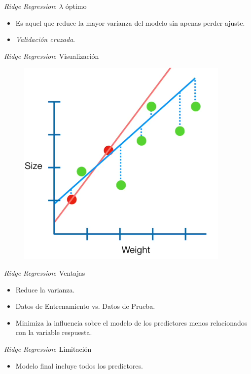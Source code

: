 \documentclass[11pt]{beamer}
\begin{document}
\begin{frame}{\textit{Ridge Regression}: $\lambda$ óptimo}
	\begin{itemize}
		\item Es aquel que reduce la mayor varianza del modelo sin apenas perder ajuste.
		\pause
		\item \textit{Validación cruzada}.
	\end{itemize}
\end{frame}

\begin{frame}{\textit{Ridge Regression}: Visualización}
	\begin{figure}
		\includegraphics[scale=0.4]{figures/ridge.png}
	\end{figure}
\end{frame}


\begin{frame}{\textit{Ridge Regression}: Ventajas}
	\begin{itemize}
		\item Reduce la varianza.
		\pause
		\item Datos de Entrenamiento vs. Datos de Prueba.
		\pause
		\item Minimiza la influencia sobre el modelo de los predictores menos relacionados con la variable respuesta.
	\end{itemize}
\end{frame}

\begin{frame}{\textit{Ridge Regression}: Limitación}
	\begin{itemize}
		\item Modelo final incluye todos los predictores.
	\end{itemize}
\end{frame}
\end{document}
